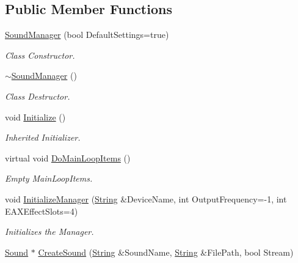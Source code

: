 \subsection*{Public Member Functions}
\begin{DoxyCompactItemize}
\item 
\hyperlink{classphys_1_1SoundManager_a42d41090652f8ef12d575d78881d6a05}{SoundManager} (bool DefaultSettings=true)
\begin{DoxyCompactList}\small\item\em Class Constructor. \item\end{DoxyCompactList}\item 
\hyperlink{classphys_1_1SoundManager_af557110e5f0eccc7be861f163e1670d0}{$\sim$SoundManager} ()
\begin{DoxyCompactList}\small\item\em Class Destructor. \item\end{DoxyCompactList}\item 
void \hyperlink{classphys_1_1SoundManager_ae6d3957f965b54e06ec540e903cec68d}{Initialize} ()
\begin{DoxyCompactList}\small\item\em Inherited Initializer. \item\end{DoxyCompactList}\item 
virtual void \hyperlink{classphys_1_1SoundManager_a577b228753ea19856b8476ab831e547e}{DoMainLoopItems} ()
\begin{DoxyCompactList}\small\item\em Empty MainLoopItems. \item\end{DoxyCompactList}\item 
void \hyperlink{classphys_1_1SoundManager_aa0fc07170611851f3fa888c8e28d99df}{InitializeManager} (\hyperlink{namespacephys_aa03900411993de7fbfec4789bc1d392e}{String} \&DeviceName, int OutputFrequency=-\/1, int EAXEffectSlots=4)
\begin{DoxyCompactList}\small\item\em Initializes the Manager. \item\end{DoxyCompactList}\item 
\hyperlink{classphys_1_1Sound}{Sound} $\ast$ \hyperlink{classphys_1_1SoundManager_ac9e68fef909b72110e9b68ff2674bcbb}{CreateSound} (\hyperlink{namespacephys_aa03900411993de7fbfec4789bc1d392e}{String} \&SoundName, \hyperlink{namespacephys_aa03900411993de7fbfec4789bc1d392e}{String} \&FilePath, bool Stream)

\end{DoxyCompactItemize}
